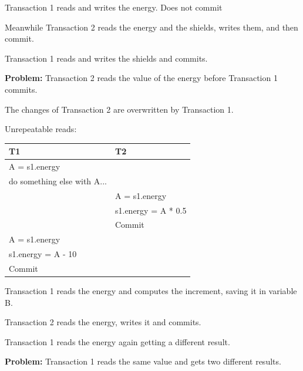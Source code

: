 \documentclass{beamer}
\begin{document}
\begin{slide}{
	\item Transaction 1 reads and writes the energy. Does not commit
	\item Meanwhile Transaction 2 reads the energy and the shields, writes them, and then commit.
	\item Transaction 1 reads and writes the shields and commits.
\pause
	\item \textbf{Problem:} Transaction 2 reads the value of the energy before Transaction 1 commits.
	\item The changes of Transaction 2 are overwritten by Transaction 1.
}\end{slide}

\begin{slide}{
		\item Unrepeatable reads:
		\begin{table}
			\tiny
			\begin{tabular}{l|l}
				T1 & T2\\
				\hline
				A = s1.energy & \\
				do something else with A... & \\
				& A = s1.energy \\
				& s1.energy = A * 0.5 \\
				& Commit \\
				A = s1.energy & \\
				s1.energy = A - 10 & \\
				Commit &
			\end{tabular}
		\end{table}	
	}\end{slide}
	
\begin{slide}{
		\item Transaction 1 reads the energy and computes the increment, saving it in variable B.
		\item Transaction 2 reads the energy, writes it and commits.
		\item Transaction 1 reads the energy again getting a different result.
\pause
		\item \textbf{Problem:} Transaction 1 reads the same value and gets two different results.
	}\end{slide}
	
\end{document}
